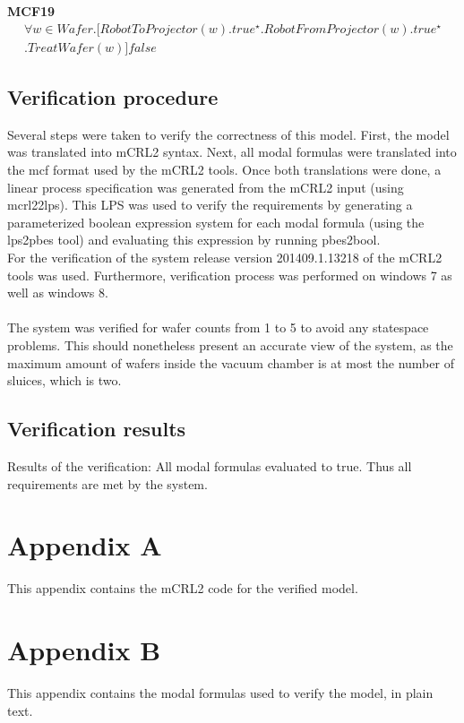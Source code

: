 \documentclass[12pt]{report}
\begin{document}
    \textbf{MCF19}
    \begin{multline*}
        [true^{\star}] \forall w \in Wafer. [RobotToProjector(w).true^{\star}.RobotFromProjector(w).true^{\star} \\
        .TreatWafer(w)]false
    \end{multline*}

	\section{Verification procedure}
	Several steps were taken to verify the correctness of this model. First, the model was translated into mCRL2 syntax. Next, all modal formulas were translated into the mcf format used by the mCRL2 tools. Once both translations were done, a linear process specification was generated from the mCRL2 input (using mcrl22lps). This LPS was used to verify the requirements by generating a parameterized boolean expression system for each modal formula (using the lps2pbes tool) and evaluating this expression by running pbes2bool.\\
	For the verification of the system release version 201409.1.13218 of the mCRL2 tools was used. Furthermore, verification process was performed on windows 7 as well as windows 8. \\
	\\
	The system was verified for wafer counts from 1 to 5 to avoid any statespace problems. This should nonetheless present an accurate view of the system, as the maximum amount of wafers inside the vacuum chamber is at most the number of sluices, which is two.
	
	\section{Verification results}
	Results of the verification: All modal formulas evaluated to true. Thus all requirements are met by the system.
	
	\chapter{Appendix A}
	This appendix contains the mCRL2 code for the verified model.
	
	

	
	\chapter{Appendix B}
	This appendix contains the modal formulas used to verify the model, in plain text.
\end{document}
